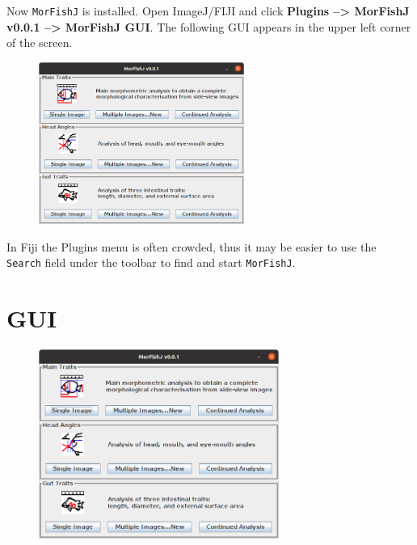 \documentclass[
  letterpaper,
]{scrbook}
\begin{document}
Now \texttt{MorFishJ} is installed. Open ImageJ/FIJI and click
\textbf{Plugins --\textgreater{} MorFishJ v0.0.1 --\textgreater{}
MorFishJ GUI}. The following GUI appears in the upper left corner of the
screen.

\begin{figure}

{\centering \includegraphics[width=0.6\textwidth,height=\textheight]{./images/screenshots/MorFishJ_GUI_v0.0.1.png}

}

\end{figure}

\begin{tcolorbox}[standard jigsaw,bottomtitle=1mm, toptitle=1mm, colframe=quarto-callout-tip-color-frame, colbacktitle=quarto-callout-tip-color!10!white, title=\textcolor{quarto-callout-tip-color}{\faLightbulb}\hspace{0.5em}{Tip}, titlerule=0mm, opacityback=0, arc=.35mm, opacitybacktitle=0.6, rightrule=.15mm, toprule=.15mm, coltitle=black, left=2mm, colback=white, leftrule=.75mm, bottomrule=.15mm]
In Fiji the Plugins menu is often crowded, thus it may be easier to use
the \texttt{Search} field under the toolbar to find and start
\texttt{MorFishJ}.
\end{tcolorbox}

\hypertarget{gui}{%
\chapter{GUI}\label{gui}}

\begin{figure}

{\centering \includegraphics[width=0.7\textwidth,height=\textheight]{./images/screenshots/MorFishJ_GUI_v0.0.1.png}

}

\end{figure}
\end{document}
